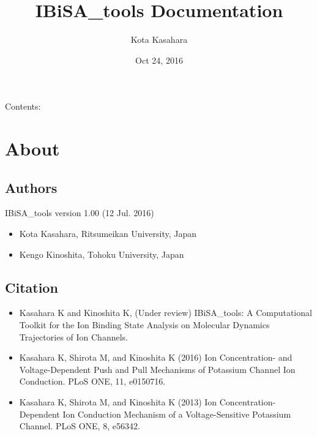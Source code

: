 \documentclass[letterpaper,10pt,english]{sphinxmanual}
\title{IBiSA\_tools Documentation}
\date{Oct 24, 2016}
\author{Kota Kasahara}
\begin{document}
\maketitle
\tableofcontents
{}\label{index::doc}


Contents:


\chapter{About}
\label{about:about}\label{about::doc}\label{about:welcome-to-ibisa-tools-s-documentation}

\section{Authors}
\label{about:authors}
IBiSA\_tools version 1.00 (12 Jul. 2016)
\begin{itemize}
\item {} 
Kota Kasahara, Ritsumeikan University, Japan

\item {} 
Kengo Kinoshita, Tohoku University, Japan

\end{itemize}


\section{Citation}
\label{about:citation}\begin{itemize}
\item {} 
Kasahara K and Kinoshita K, (Under review) IBiSA\_tools: A Computational Toolkit for the Ion Binding State Analysis on Molecular Dynamics Trajectories of Ion Channels.

\item {} 
Kasahara K, Shirota M, and Kinoshita K (2016) Ion Concentration- and Voltage-Dependent Push and Pull Mechanisms of Potassium Channel Ion Conduction. PLoS ONE, 11, e0150716.

\item {} 
Kasahara K, Shirota M, and Kinoshita K (2013) Ion Concentration-Dependent Ion Conduction Mechanism of a Voltage-Sensitive Potassium Channel. PLoS ONE, 8, e56342.

\end{itemize}
\end{document}
